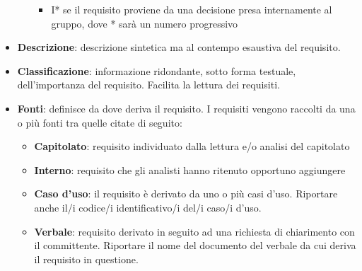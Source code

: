 \begin{itemize}
\begin{itemize}
\begin{itemize}
			\item I* se il requisito proviene da una decisione presa internamente al gruppo, dove * sarà un numero progressivo
		\end{itemize}
\end{itemize}
	\item \textbf{Descrizione}: descrizione sintetica ma al contempo esaustiva del requisito.
	\item \textbf{Classificazione}: informazione ridondante, sotto forma testuale, dell’importanza del requisito. Facilita la lettura dei requisiti.
	\item \textbf{Fonti}: definisce da dove deriva il requisito. I requisiti vengono raccolti da una o più fonti tra quelle citate di seguito:
	\begin{itemize}
		\item \textbf{Capitolato}: requisito individuato dalla lettura e/o analisi del capitolato
		\item \textbf{Interno}: requisito che gli analisti hanno ritenuto opportuno aggiungere
		\item \textbf{Caso d’uso}: il requisito è derivato da uno o più casi d’uso. Riportare anche il/i codice/i identificativo/i del/i caso/i d’uso.
		\item \textbf{Verbale}: requisito derivato in seguito ad una richiesta di chiarimento con il committente. Riportare il nome del documento del verbale da cui deriva il requisito in questione.		
	\end{itemize}
\end{itemize}

